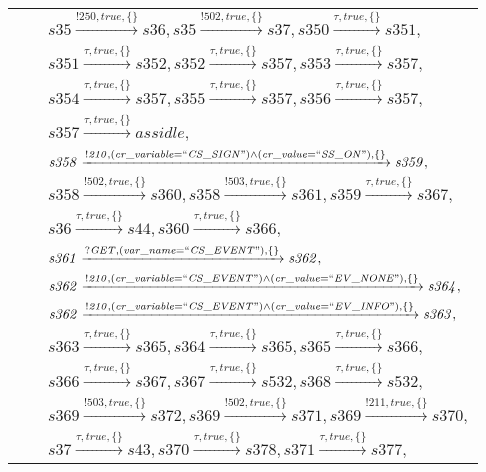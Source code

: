 \begin{tabular}{lcl}
& & $\mathit{s35}\xrightarrow{\mathit{!250}, \mathit{true}, \{\}}\mathit{s36},\mathit{s35}\xrightarrow{\mathit{!502}, \mathit{true}, \{\}}\mathit{s37},\mathit{s350}\xrightarrow{\mathit{\tau}, \mathit{true}, \{\}}\mathit{s351},$ \\
& & $\mathit{s351}\xrightarrow{\mathit{\tau}, \mathit{true}, \{\}}\mathit{s352},\mathit{s352}\xrightarrow{\mathit{\tau}, \mathit{true}, \{\}}\mathit{s357},\mathit{s353}\xrightarrow{\mathit{\tau}, \mathit{true}, \{\}}\mathit{s357},$ \\
& & $\mathit{s354}\xrightarrow{\mathit{\tau}, \mathit{true}, \{\}}\mathit{s357},\mathit{s355}\xrightarrow{\mathit{\tau}, \mathit{true}, \{\}}\mathit{s357},\mathit{s356}\xrightarrow{\mathit{\tau}, \mathit{true}, \{\}}\mathit{s357},$ \\
& & $\mathit{s357}\xrightarrow{\mathit{\tau}, \mathit{true}, \{\}}\mathit{assidle},$ \\
& & $\mathit{s358}\xrightarrow{\mathit{!210}, \mathit{(cr\_variable = ``CS\_SIGN") \land (cr\_value = ``SS\_ON")}, \{\}}\mathit{s359},$ \\
& & $\mathit{s358}\xrightarrow{\mathit{!502}, \mathit{true}, \{\}}\mathit{s360},\mathit{s358}\xrightarrow{\mathit{!503}, \mathit{true}, \{\}}\mathit{s361},\mathit{s359}\xrightarrow{\mathit{\tau}, \mathit{true}, \{\}}\mathit{s367},$ \\
& & $\mathit{s36}\xrightarrow{\mathit{\tau}, \mathit{true}, \{\}}\mathit{s44},\mathit{s360}\xrightarrow{\mathit{\tau}, \mathit{true}, \{\}}\mathit{s366},$ \\
& & $\mathit{s361}\xrightarrow{\mathit{?GET}, \mathit{(var\_name = ``CS\_EVENT")}, \{\}}\mathit{s362},$ \\
& & $\mathit{s362}\xrightarrow{\mathit{!210}, \mathit{(cr\_variable = ``CS\_EVENT") \land (cr\_value = ``EV\_NONE")}, \{\}}\mathit{s364},$ \\
& & $\mathit{s362}\xrightarrow{\mathit{!210}, \mathit{(cr\_variable = ``CS\_EVENT") \land (cr\_value = ``EV\_INFO")}, \{\}}\mathit{s363},$ \\
& & $\mathit{s363}\xrightarrow{\mathit{\tau}, \mathit{true}, \{\}}\mathit{s365},\mathit{s364}\xrightarrow{\mathit{\tau}, \mathit{true}, \{\}}\mathit{s365},\mathit{s365}\xrightarrow{\mathit{\tau}, \mathit{true}, \{\}}\mathit{s366},$ \\
& & $\mathit{s366}\xrightarrow{\mathit{\tau}, \mathit{true}, \{\}}\mathit{s367},\mathit{s367}\xrightarrow{\mathit{\tau}, \mathit{true}, \{\}}\mathit{s532},\mathit{s368}\xrightarrow{\mathit{\tau}, \mathit{true}, \{\}}\mathit{s532},$ \\
& & $\mathit{s369}\xrightarrow{\mathit{!503}, \mathit{true}, \{\}}\mathit{s372},\mathit{s369}\xrightarrow{\mathit{!502}, \mathit{true}, \{\}}\mathit{s371},\mathit{s369}\xrightarrow{\mathit{!211}, \mathit{true}, \{\}}\mathit{s370},$ \\
& & $\mathit{s37}\xrightarrow{\mathit{\tau}, \mathit{true}, \{\}}\mathit{s43},\mathit{s370}\xrightarrow{\mathit{\tau}, \mathit{true}, \{\}}\mathit{s378},\mathit{s371}\xrightarrow{\mathit{\tau}, \mathit{true}, \{\}}\mathit{s377},$ \\
\end{tabular}

